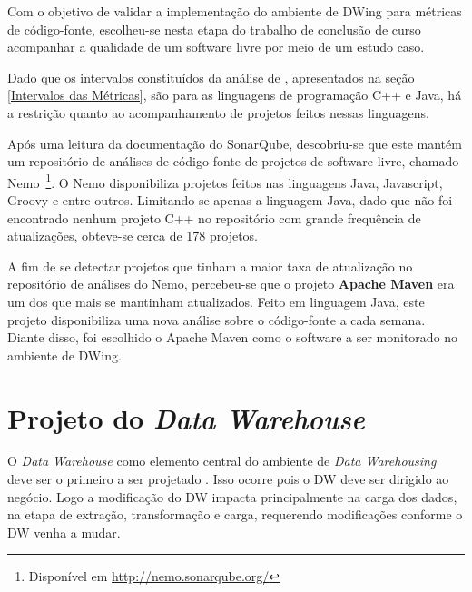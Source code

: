 Com o objetivo de validar a implementação do ambiente de DWing para métricas de código-fonte, escolheu-se nesta etapa do trabalho de conclusão de curso acompanhar a qualidade de um software livre por meio de um estudo caso.

Dado que os intervalos constituídos da análise de , apresentados na seção \ref{Intervalos das Métricas}, são para as linguagens de programação C++ e Java, há a restrição quanto ao acompanhamento de projetos feitos nessas linguagens.

Após uma leitura da documentação do SonarQube, descobriu-se que este mantém um repositório de análises de código-fonte de projetos de software livre, chamado Nemo~\footnote{Disponível em \url{http://nemo.sonarqube.org/}}. O Nemo disponibiliza projetos feitos nas linguagens Java, Javascript, Groovy e entre outros. Limitando-se apenas a linguagem Java, dado que não foi encontrado nenhum projeto C++ no repositório com grande frequência de atualizações, obteve-se cerca de 178 projetos.

A fim de se detectar projetos que tinham a maior taxa de atualização no repositório de análises do Nemo, percebeu-se que o projeto \textbf{Apache Maven} era um dos que mais se mantinham atualizados. Feito em linguagem Java, este projeto disponibiliza uma nova análise sobre o código-fonte a cada semana. Diante disso, foi escolhido o Apache Maven como o software a ser monitorado no ambiente de DWing. 


\section{Projeto do \textit{Data Warehouse}}

O \textit{Data Warehouse} como elemento central do ambiente de \textit{Data Warehousing} deve ser o primeiro a ser projetado \cite{Kimball2002}. Isso ocorre pois o DW deve ser dirigido ao negócio. Logo a modificação do DW impacta principalmente na carga dos dados, na etapa de extração, transformação e carga, requerendo modificações conforme o DW venha a mudar.

